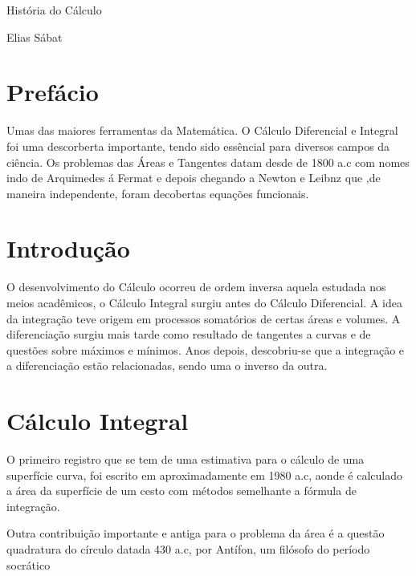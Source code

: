 \documentclass[a4paper, 12pt]{article}
\begin{document}
	\begin{center}
\huge{História do Cálculo}
	\end{center}

	\begin{center}
Elias Sábat
	\end{center}
 
	\section{Prefácio}
Umas das maiores ferramentas da Matemática. O Cálculo Diferencial e Integral foi uma descorberta importante, tendo sido essêncial para diversos campos da ciência. Os problemas das Áreas e Tangentes datam desde de 1800 a.c com nomes indo de Arquimedes á Fermat e depois chegando a Newton e Leibnz que ,de maneira independente, foram decobertas equações funcionais.
	\section{Introdução}
O desenvolvimento do Cálculo ocorreu de ordem inversa aquela estudada nos meios acadêmicos, o Cálculo Integral surgiu antes do Cálculo Diferencial. A idea da integração teve origem em processos somatórios de certas áreas e volumes. A diferenciação surgiu mais tarde como resultado de tangentes a curvas e de questões sobre máximos e mínimos. Anos depois, descobriu-se que a integração e a diferenciação estão relacionadas, sendo uma o inverso da outra.
	\section{Cálculo Integral}
O primeiro registro que se tem de uma estimativa para o cálculo de uma superfície curva, foi escrito em aproximadamente em 1980 a.c, aonde é calculado a área da superfície de um cesto com métodos semelhante a fórmula de integração.

Outra contribuição importante e antiga para o problema da área é a questão quadratura do círculo datada 430 a.c, por Antífon, um filósofo do período socrático 
\end{document}
